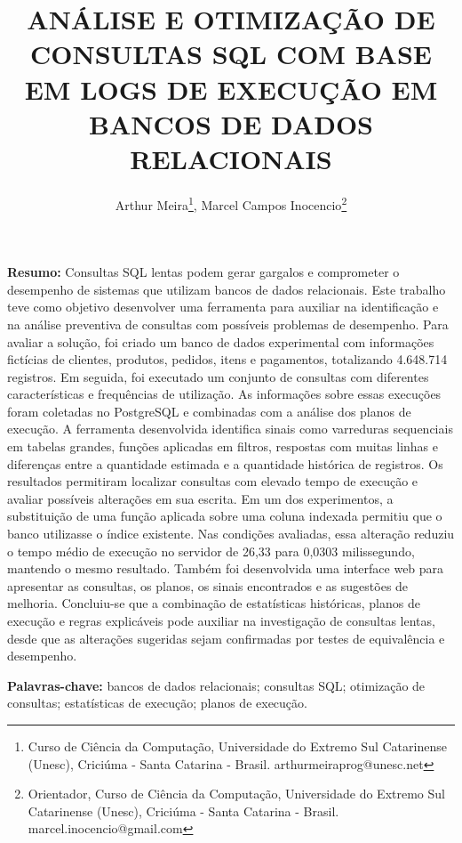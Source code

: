 \documentclass{UNESC}
\title{ANÁLISE E OTIMIZAÇÃO DE CONSULTAS SQL COM BASE EM LOGS DE EXECUÇÃO EM BANCOS DE DADOS RELACIONAIS}
\author
{
   Arthur Meira\footnote{Curso de Ciência da Computação, Universidade do Extremo Sul Catarinense (Unesc), Criciúma - Santa Catarina - Brasil. arthurmeiraprog@unesc.net},
   Marcel Campos Inocencio\footnote{Orientador, Curso de Ciência da Computação, Universidade do Extremo Sul Catarinense (Unesc), Criciúma - Santa Catarina - Brasil. marcel.inocencio@gmail.com}
}
\begin{document}
\onehalfspacing

\maketitle


\noindent
\textbf{Resumo:} Consultas SQL lentas podem gerar gargalos e comprometer o desempenho de sistemas que utilizam bancos de dados relacionais. Este trabalho teve como objetivo desenvolver uma ferramenta para auxiliar na identificação e na análise preventiva de consultas com possíveis problemas de desempenho. Para avaliar a solução, foi criado um banco de dados experimental com informações fictícias de clientes, produtos, pedidos, itens e pagamentos, totalizando 4.648.714 registros. Em seguida, foi executado um conjunto de consultas com diferentes características e frequências de utilização. As informações sobre essas execuções foram coletadas no PostgreSQL e combinadas com a análise dos planos de execução. A ferramenta desenvolvida identifica sinais como varreduras sequenciais em tabelas grandes, funções aplicadas em filtros, respostas com muitas linhas e diferenças entre a quantidade estimada e a quantidade histórica de registros. Os resultados permitiram localizar consultas com elevado tempo de execução e avaliar possíveis alterações em sua escrita. Em um dos experimentos, a substituição de uma função aplicada sobre uma coluna indexada permitiu que o banco utilizasse o índice existente. Nas condições avaliadas, essa alteração reduziu o tempo médio de execução no servidor de 26,33 para 0,0303 milissegundo, mantendo o mesmo resultado. Também foi desenvolvida uma interface web para apresentar as consultas, os planos, os sinais encontrados e as sugestões de melhoria. Concluiu-se que a combinação de estatísticas históricas, planos de execução e regras explicáveis pode auxiliar na investigação de consultas lentas, desde que as alterações sugeridas sejam confirmadas por testes de equivalência e desempenho.

\vspace{0.5em}
\noindent
\textbf{Palavras-chave:} bancos de dados relacionais; consultas SQL; otimização de consultas; estatísticas de execução; planos de execução.
\end{document}
